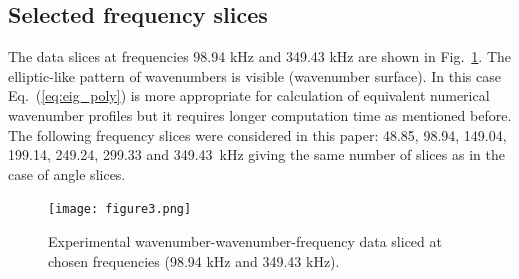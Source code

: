 \documentclass[preprint,12pt]{elsarticle}
\begin{document}
\subsection{Selected frequency slices}
The data slices at frequencies 98.94 kHz and 349.43 kHz are shown in Fig.~\ref{fig:freq_slice}. 
The elliptic-like pattern of wavenumbers is visible (wavenumber surface).
In this case Eq.~(\ref{eq:eig_poly}) is more appropriate for calculation of equivalent numerical wavenumber profiles but it requires longer computation time as mentioned before.
The following frequency slices were considered in this paper: 48.85, 98.94, 149.04, 199.14, 249.24, 299.33 and 349.43~kHz giving the same number of slices as in the case of angle slices.
\begin{figure} [h!]
	\centering
	\texttt{[image: figure3.png]}	
	\caption{Experimental wavenumber-wavenumber-frequency data sliced at chosen frequencies (98.94 kHz and 349.43 kHz).}
	\label{fig:freq_slice}
\end{figure}
\end{document}
